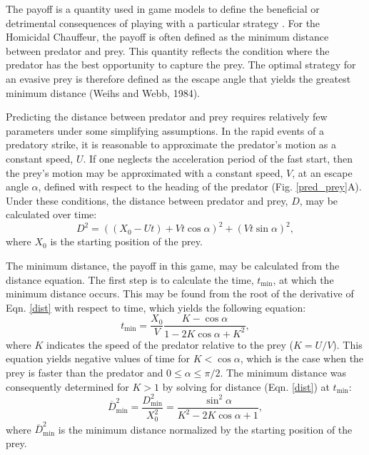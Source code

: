 \documentclass[12pt]{article}
\newcommand{\ol}{\overline}
\begin{document}
The payoff is a quantity used in game models to define the beneficial or detrimental consequences of playing with a particular strategy \citep{Webb:2007hg}. For the Homicidal Chauffeur, the payoff is often defined as the minimum distance between predator and prey. 
This quantity reflects the condition where the predator has the best opportunity to capture the prey. The optimal strategy for an evasive prey is therefore defined as the escape angle that yields the greatest minimum distance (Weihs and Webb, 1984).

Predicting the distance between predator and prey requires relatively few parameters under some simplifying assumptions. In the rapid events of a predatory strike, it is reasonable to approximate the predator's motion as a constant speed, $U$. 
If one neglects the acceleration period of the fast start, then the prey's motion may be approximated with a constant speed, $V$, at an escape angle $\alpha$, defined with respect to the heading of the predator (Fig. \ref{pred_prey}A). Under these conditions, the distance between predator and prey, $D$, may be calculated over time:
%
\begin{equation}
D^2 = ((X_0 - Ut) + Vt\cos\alpha)^2 + (Vt\sin\alpha)^2,
\label{dist}
\end{equation}
%
where $X_0$ is the starting position of the prey.

The minimum distance, the payoff in this game, may be calculated from the distance equation. The first step is to calculate the time, $t_{\text{min}}$,  at which the minimum distance occurs. This may be found from the root of the derivative of Eqn. \ref{dist} with respect to time, which yields the following equation:
%
\begin{equation}
t_{\text{min}} = \frac{X_0}{V} \frac{K-\cos\alpha}{1-2 K\cos\alpha+K^2},
\label{eq33weihs}	
\end{equation}
%
where $K$ indicates the speed of the predator relative to the prey ($K = U/V$). This equation yields negative values of time for $K < \cos\alpha$, which is the case when the prey is faster than the predator and $0 \leq \alpha \leq \pi/2$. The minimum distance was consequently determined for $K>1$ by solving for distance (Eqn. \ref{dist}) at $t_{\text{min}}$:
%
\begin{equation}
\ol D_{\text{min}}^2 = \frac{D_{\text{min}}^2}{X_0^2} = \frac{\sin^2\alpha}{K^2 - 2K \cos\alpha + 1},
\label{dmin}
\end{equation}
where $\ol D_{\text{min}}^2$ is the minimum distance normalized by the starting position of the prey.
\end{document}
